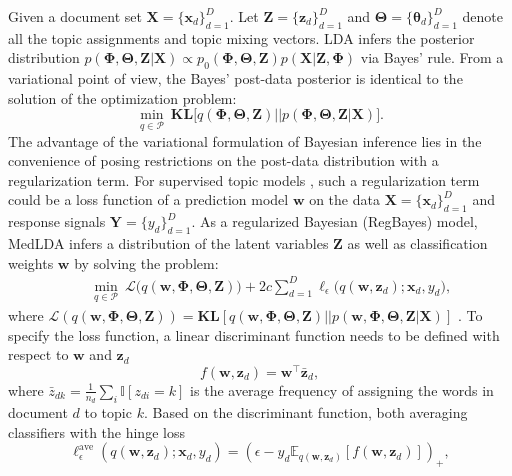 \documentclass[twoside,11pt]{article}
\newcommand{\xv}{\bm{x}}
\newcommand{\Xv}{\bm{X}}
\newcommand{\Yv}{\bm{Y}}
\newcommand{\zv}{\bm{z}}
\newcommand{\Zv}{\bm{Z}}
\newcommand{\wv}{\bm{w}}
\newcommand{\Thetav}{\bm{\Theta}}
\newcommand{\Phiv}{\bm{\Phi}}
\newcommand{\KL}{\textbf{KL}}
\begin{document}
Given a document set $\Xv = \{\xv_d\}_{d=1}^D$. Let $\bm{Z} = \{\bm{z}_d\}_{d=1}^D$ and $\Thetav = \{\bm{\theta}_d\}_{d=1}^{D}$ denote all the topic assignments and topic mixing vectors. LDA infers the posterior distribution $p( \bm{\Phi}, \bm{\Theta}, \bm{Z} | \bm{X}) \propto p_0(\bm{\Phi}, \bm{\Theta}, \bm{Z}) p(\bm{X} | \bm{Z}, \bm{\Phi})$ via Bayes' rule. From a variational point of view, the Bayes' post-data posterior is identical to the solution of the optimization problem:
\begin{equation*}%
\min\limits_{q \in \mathcal{P}}~\KL\Big[ q(\Phiv, \Thetav, \Zv) || p(\Phiv, \Thetav, \Zv | \Xv) \Big]. %
\end{equation*}
The advantage of the variational formulation of Bayesian inference lies in the convenience of posing restrictions on the post-data distribution with a regularization term. For supervised topic models \citep{blei2010supervised,zhu2012medlda}, such a regularization term could be a loss function of a prediction model $\bm{w}$ on the data $\Xv = \{\xv_d\}_{d=1}^D$ and response signals $\Yv = \{y_d\}_{d=1}^D$. As a regularized Bayesian (RegBayes) model, MedLDA infers a distribution of the latent variables $\Zv$ as well as classification weights $\wv$ by solving the problem:
\setlength\arraycolsep{-2pt}\begin{eqnarray*}
&& \min\limits_{q \in \mathcal{P}}  ~\mathcal{L}\Big( q(\wv, \Phiv, \Thetav, \Zv) \Big) + 2c \sum\limits_{d=1}^{D}{\ell_{\epsilon}\Big( q(\wv, \zv_d); \xv_d, y_d \Big)},
\end{eqnarray*}
where \small $\mathcal{L}( q(\wv, \Phiv, \Thetav, \Zv) ) = \KL[q(\wv, \Phiv, \Thetav, \Zv) || p(\wv, \Phiv, \Thetav, \Zv | \Xv)]$ \normalsize. To specify the loss function, a linear discriminant function needs to be defined with respect to $\bm{w}$ and $\bm{z}_d$
%
\setlength\arraycolsep{1pt}\begin{equation}\label{eq:disc-func-latent}
f(\wv, \zv_d) = \wv^\top \bar{\zv}_d,
\end{equation}
%
where $\bar{z}_{dk} = \frac{1}{n_d} \sum_i{\mathbb{I}[z_{di} = k]}$ is the average frequency of assigning the words in document $d$ to topic $k$. Based on the discriminant function, both averaging classifiers with the hinge loss
\begin{equation} \label{eq:batch_bayes_loss}
\ell^\text{ave}_{\epsilon}(q(\wv, \zv_d); \xv_d, y_d) = \left( \epsilon - y_d \mathbb{E}_{q(\wv, \zv_d)}[f(\bm{w}, \bm{z}_d)] \right)_+,
\end{equation}
\end{document}
